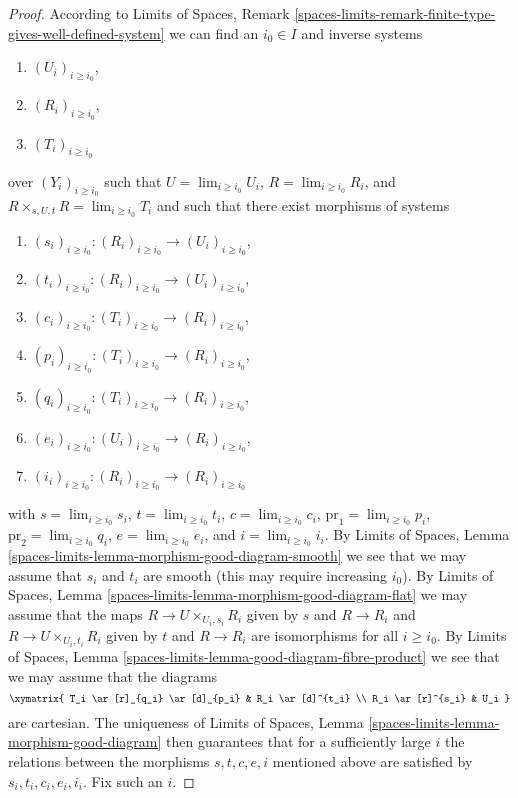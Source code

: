 \begin{proof}
\medskip\noindent
According to Limits of Spaces, Remark
\ref{spaces-limits-remark-finite-type-gives-well-defined-system}
we can find an $i_0 \in I$ and inverse systems
\begin{enumerate}
\item $(U_i)_{i \geq i_0}$,
\item $(R_i)_{i \geq i_0}$,
\item $(T_i)_{i \geq i_0}$
\end{enumerate}
over $(Y_i)_{i \geq i_0}$ such that
$U = \lim_{i \geq i_0} U_i$,
$R = \lim_{i \geq i_0} R_i$, and
$R \times_{s, U, t} R = \lim_{i \geq i_0} T_i$
and such that there exist morphisms of systems
\begin{enumerate}
\item $(s_i)_{i \geq i_0} : (R_i)_{i \geq i_0} \to (U_i)_{i \geq i_0}$,
\item $(t_i)_{i \geq i_0} : (R_i)_{i \geq i_0} \to (U_i)_{i \geq i_0}$,
\item $(c_i)_{i \geq i_0} : (T_i)_{i \geq i_0} \to (R_i)_{i \geq i_0}$,
\item $(p_i)_{i \geq i_0} : (T_i)_{i \geq i_0} \to (R_i)_{i \geq i_0}$,
\item $(q_i)_{i \geq i_0} : (T_i)_{i \geq i_0} \to (R_i)_{i \geq i_0}$,
\item $(e_i)_{i \geq i_0} : (U_i)_{i \geq i_0} \to (R_i)_{i \geq i_0}$,
\item $(i_i)_{i \geq i_0} : (R_i)_{i \geq i_0} \to (R_i)_{i \geq i_0}$
\end{enumerate}
with
$s = \lim_{i \geq i_0} s_i$,
$t = \lim_{i \geq i_0} t_i$,
$c = \lim_{i \geq i_0} c_i$,
$\text{pr}_1 = \lim_{i \geq i_0} p_i$,
$\text{pr}_2 = \lim_{i \geq i_0} q_i$,
$e = \lim_{i \geq i_0} e_i$, and
$i = \lim_{i \geq i_0} i_i$.
By Limits of Spaces, Lemma
\ref{spaces-limits-lemma-morphism-good-diagram-smooth}
we see that we may assume that $s_i$ and $t_i$ are smooth
(this may require increasing $i_0$).
By Limits of Spaces, Lemma
\ref{spaces-limits-lemma-morphism-good-diagram-flat}
we may assume that the maps
$R \to U \times_{U_i, s_i} R_i$ given by $s$ and $R \to R_i$ and
$R \to U \times_{U_i, t_i} R_i$ given by $t$ and $R \to R_i$
are isomorphisms for all $i \geq i_0$.
By Limits of Spaces, Lemma \ref{spaces-limits-lemma-good-diagram-fibre-product}
we see that we may assume that the diagrams
$$
\xymatrix{
T_i \ar[r]_{q_i} \ar[d]_{p_i} & R_i \ar[d]^{t_i} \\
R_i \ar[r]^{s_i} & U_i
}
$$
are cartesian. The uniqueness of
Limits of Spaces, Lemma \ref{spaces-limits-lemma-morphism-good-diagram}
then guarantees that for a sufficiently large $i$
the relations between the morphisms $s, t, c, e, i$ mentioned above
are satisfied by $s_i, t_i, c_i, e_i, i_i$. Fix such an $i$.


\end{proof}
